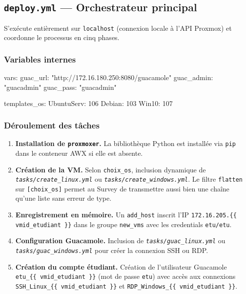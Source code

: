 \documentclass[a4paper]{article}
\newcommand{\cmd}[1]{\texttt{#1}}
\newcommand{\file}[1]{\texttt{\textit{#1}}}
\begin{document}
\subsection{\texttt{deploy.yml} --- Orchestrateur principal}

S'exécute entièrement sur \cmd{localhost} (connexion locale à l'API Proxmox) et coordonne le processus en cinq phases.

\subsubsection*{Variables internes}

\begin{yamlcode}
vars:
  guac_url:   "http://172.16.180.250:8080/guacamole"
  guac_admin: "guacadmin"
  guac_pass:  "guacadmin"

  templates_os:
    UbuntuServ: 106
    Debian:     103
    Win10:      107
\end{yamlcode}

\subsubsection*{Déroulement des tâches}

\begin{enumerate}
  \item \textbf{Installation de \cmd{proxmoxer}.} La bibliothèque Python est installée via \cmd{pip} dans le conteneur AWX si elle est absente.

  \item \textbf{Création de la VM.} Selon \cmd{choix\_os}, inclusion dynamique de \file{tasks/create\_linux.yml} ou \file{tasks/create\_windows.yml}. Le filtre \cmd{flatten} sur \cmd{[choix\_os]} permet au Survey de transmettre aussi bien une chaîne qu'une liste sans erreur de type.

  \item \textbf{Enregistrement en mémoire.} Un \cmd{add\_host} inscrit l'IP \cmd{172.16.205.\{\{ vmid\_etudiant \}\}} dans le groupe \cmd{new\_vms} avec les credentials \cmd{etu/etu}.

  \item \textbf{Configuration Guacamole.} Inclusion de \file{tasks/guac\_linux.yml} ou \file{tasks/guac\_windows.yml} pour créer la connexion SSH ou RDP.

  \item \textbf{Création du compte étudiant.} Création de l'utilisateur Guacamole \cmd{etu\_\{\{ vmid\_etudiant \}\}} (mot de passe \cmd{etu}) avec accès aux connexions \cmd{SSH\_Linux\_\{\{ vmid\_etudiant \}\}} et \cmd{RDP\_Windows\_\{\{ vmid\_etudiant \}\}}.
\end{enumerate}
\end{document}
